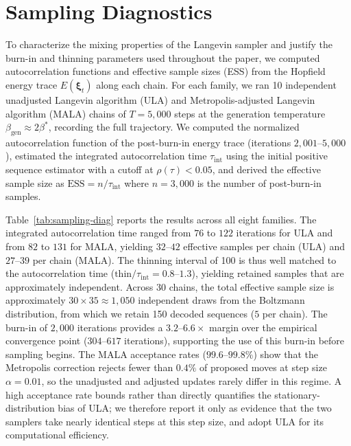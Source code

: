 \documentclass[10pt]{article}
\begin{document}
\section{Sampling Diagnostics}\label{si:sampling-diagnostics}

To characterize the mixing properties of the Langevin sampler and justify the burn-in and thinning parameters used throughout the paper, we computed autocorrelation functions and effective sample sizes (ESS) from the Hopfield energy trace $E(\boldsymbol{\xi}_t)$ along each chain. For each family, we ran 10 independent unadjusted Langevin algorithm (ULA) and Metropolis-adjusted Langevin algorithm (MALA) chains of $T{=}5{,}000$ steps at the generation temperature $\beta_{\mathrm{gen}} \approx 2\beta^*$, recording the full trajectory. We computed the normalized autocorrelation function of the post-burn-in energy trace (iterations $2{,}001$--$5{,}000$), estimated the integrated autocorrelation time $\tau_{\mathrm{int}}$ using the initial positive sequence estimator with a cutoff at $\rho(\tau) < 0.05$, and derived the effective sample size as $\mathrm{ESS} = n/\tau_{\mathrm{int}}$ where $n{=}3{,}000$ is the number of post-burn-in samples.

Table~\ref{tab:sampling-diag} reports the results across all eight families. The integrated autocorrelation time ranged from $76$ to $122$ iterations for ULA and from $82$ to $131$ for MALA, yielding $32$--$42$ effective samples per chain (ULA) and $27$--$39$ per chain (MALA). The thinning interval of 100 is thus well matched to the autocorrelation time ($\mathrm{thin}/\tau_{\mathrm{int}} = 0.8$--$1.3$), yielding retained samples that are approximately independent. Across 30 chains, the total effective sample size is approximately $30 \times 35 \approx 1{,}050$ independent draws from the Boltzmann distribution, from which we retain 150 decoded sequences ($5$ per chain). The burn-in of $2{,}000$ iterations provides a $3.2$--$6.6\times$ margin over the empirical convergence point ($304$--$617$ iterations), supporting the use of this burn-in before sampling begins. The MALA acceptance rates ($99.6$--$99.8\%$) show that the Metropolis correction rejects fewer than $0.4\%$ of proposed moves at step size $\alpha{=}0.01$, so the unadjusted and adjusted updates rarely differ in this regime. A high acceptance rate bounds rather than directly quantifies the stationary-distribution bias of ULA; we therefore report it only as evidence that the two samplers take nearly identical steps at this step size, and adopt ULA for its computational efficiency.
\end{document}

